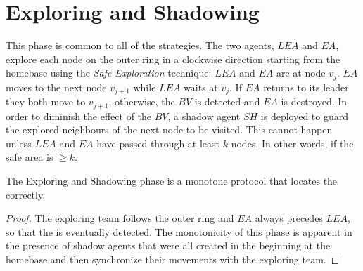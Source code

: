 \section{Exploring and Shadowing}

This phase is common to all of the strategies.
The two agents,  $LEA$ and $EA$,   explore each node on the outer ring in a clockwise direction starting from the homebase  using the {\em Safe Exploration} technique:  $LEA$ and $EA$ are at node $v_{j}$. $EA$ moves to the next node $v_{j+1}$ while $LEA$ waits at $v_{j}$. If $EA$ returns to its leader they both move to $v_{j+1}$, otherwise, the $BV$ is detected and $EA$ is destroyed. 
In order to diminish the effect of the $BV$, a shadow agent $SH$ is deployed to guard the explored neighbours of the next node to be visited. This cannot happen unless $LEA$ and $EA$ have passed through at least $k$ nodes. In other words, if the safe area is $\ge k$.
 \begin{lemma}\label{monotone_ph1}
The Exploring and Shadowing phase is a monotone protocol that locates the \bv correctly.
\end{lemma}
\begin{proof}
The  exploring team follows the outer ring and $EA$ always precedes $LEA$, so that the \bv is eventually detected. The monotonicity of this phase is apparent in the presence of shadow agents that were all created in the beginning at the homebase and then synchronize their movements with the exploring team. 
\end{proof}
 \begin{center}
\end{center}

